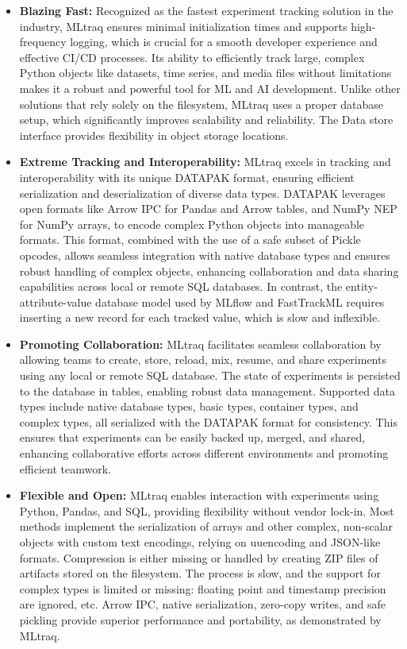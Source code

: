 \begin{itemize}
    \item \textbf{Blazing Fast:} Recognized as the fastest experiment tracking solution in the industry, MLtraq ensures minimal initialization times and supports high-frequency logging, which is crucial for a smooth developer experience and effective CI/CD processes. Its ability to efficiently track large, complex Python objects like datasets, time series, and media files without limitations makes it a robust and powerful tool for ML and AI development. Unlike other solutions that rely solely on the filesystem, MLtraq uses a proper database setup, which significantly improves scalability and reliability. The Data store interface provides flexibility in object storage locations.
    \item \textbf{Extreme Tracking and Interoperability:} MLtraq excels in tracking and interoperability with its unique DATAPAK format, ensuring efficient serialization and deserialization of diverse data types. DATAPAK leverages open formats like Arrow IPC for Pandas and Arrow tables, and NumPy NEP for NumPy arrays, to encode complex Python objects into manageable formats. This format, combined with the use of a safe subset of Pickle opcodes, allows seamless integration with native database types and ensures robust handling of complex objects, enhancing collaboration and data sharing capabilities across local or remote SQL databases. In contrast, the entity-attribute-value database model used by MLflow and FastTrackML requires inserting a new record for each tracked value, which is slow and inflexible.
    \item \textbf{Promoting Collaboration:} MLtraq facilitates seamless collaboration by allowing teams to create, store, reload, mix, resume, and share experiments using any local or remote SQL database. The state of experiments is persisted to the database in tables, enabling robust data management. Supported data types include native database types, basic types, container types, and complex types, all serialized with the DATAPAK format for consistency. This ensures that experiments can be easily backed up, merged, and shared, enhancing collaborative efforts across different environments and promoting efficient teamwork.
    \item \textbf{Flexible and Open:} MLtraq enables interaction with experiments using Python, Pandas, and SQL, providing flexibility without vendor lock-in. Most methods implement the serialization of arrays and other complex, non-scalar objects with custom text encodings, relying on uuencoding and JSON-like formats. Compression is either missing or handled by creating ZIP files of artifacts stored on the filesystem. The process is slow, and the support for complex types is limited or missing: floating point and timestamp precision are ignored, etc. Arrow IPC, native serialization, zero-copy writes, and safe pickling provide superior performance and portability, as demonstrated by MLtraq.
\end{itemize}

